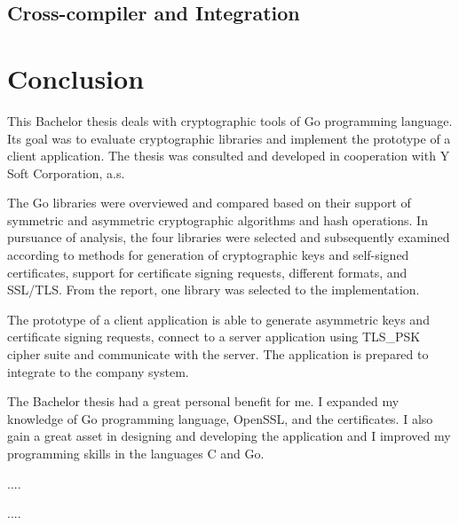 \documentclass[
  digital, %
  notable,   %
  lof,     %
  lot,     %
]{fithesis3}
\begin{document}
\section{Cross-compiler and Integration}




\chapter{Conclusion}
This Bachelor thesis deals with cryptographic tools of Go programming language. Its goal was to 
evaluate cryptographic libraries and implement the prototype of a client application. The thesis 
was consulted and developed in cooperation with Y Soft Corporation, a.s.

The Go libraries were overviewed and compared based on their support of symmetric and asymmetric 
cryptographic algorithms and hash operations. In pursuance of analysis, the four libraries were 
selected and subsequently examined according to methods for generation of cryptographic keys and 
self-signed certificates, support for certificate signing requests, different formats, and 
SSL/TLS.  From the report, one library was selected to the implementation.

The prototype of a client application is able to generate asymmetric keys and certificate signing 
requests, connect to a server application using TLS\_PSK cipher suite and communicate with the 
server. The application is prepared to integrate to the company system.

The Bachelor thesis had a great personal benefit for me. I expanded my knowledge of Go programming 
language, OpenSSL, and the certificates. I also gain a great asset in designing and developing the 
application and I improved my programming skills in the languages C and Go. 

....

....

\printbibliography
\end{document}

